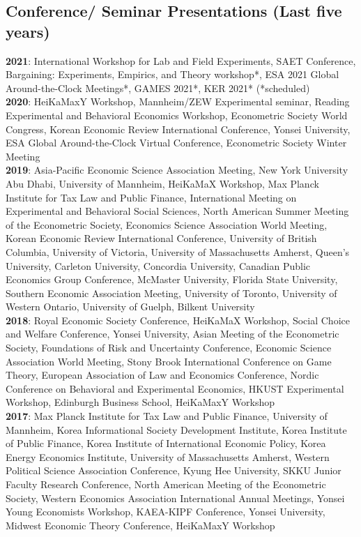 \documentclass[margin, letterpaper]{res}
\begin{document}
\begin{resume}
\section{Conference/ Seminar Presentations (Last five years)}
\textbf{2021}: International Workshop for Lab and Field Experiments, SAET Conference, Bargaining: Experiments, Empirics, and Theory workshop*, ESA 2021 Global Around-the-Clock Meetings*, GAMES 2021*, KER 2021* (*scheduled)\\
\textbf{2020}: HeiKaMaxY Workshop, Mannheim/ZEW Experimental seminar, Reading Experimental and Behavioral Economics Workshop, Econometric Society World Congress, Korean Economic Review International Conference, Yonsei University, ESA Global Around-the-Clock Virtual Conference, Econometric Society Winter Meeting\\%
\textbf{2019}: Asia-Pacific Economic Science Association Meeting, New York University Abu Dhabi, University of Mannheim, HeiKaMaX Workshop, Max Planck Institute for Tax Law and Public Finance, International Meeting on Experimental and Behavioral Social Sciences, North American Summer Meeting of the Econometric Society, Economics Science Association World Meeting, Korean Economic Review International Conference, University of British Columbia, University of Victoria, University of Massachusetts Amherst, Queen's University, Carleton University, Concordia University, Canadian Public Economics Group Conference, McMaster University, Florida State University, Southern Economic Association Meeting, University of Toronto, University of Western Ontario, University of Guelph, Bilkent University\\
\textbf{2018}: Royal Economic Society Conference, HeiKaMaX Workshop, Social Choice and Welfare Conference, Yonsei University, Asian Meeting of the Econometric Society, Foundations of Risk and Uncertainty Conference, Economic Science Association World Meeting, Stony Brook International Conference on Game Theory, European Association of Law and Economics Conference, Nordic Conference on Behavioral and Experimental Economics, HKUST Experimental Workshop, Edinburgh Business School, HeiKaMaxY Workshop\\
\textbf{2017}: Max Planck Institute for Tax Law and Public Finance, University of Mannheim, Korea Informational Society Development Institute, Korea Institute of Public Finance, Korea Institute of International Economic Policy, Korea Energy Economics Institute, University of Massachusetts Amherst, Western Political Science Association Conference, Kyung Hee University, SKKU Junior Faculty Research Conference, North American Meeting of the Econometric Society, Western Economics Association International Annual Meetings, Yonsei Young Economists Workshop, KAEA-KIPF Conference, Yonsei University, Midwest Economic Theory Conference, HeiKaMaxY Workshop%

\end{resume}
\end{document}
